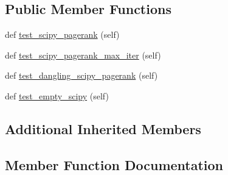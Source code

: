\subsection*{Public Member Functions}
\begin{DoxyCompactItemize}
\item 
def \hyperlink{classnetworkx_1_1algorithms_1_1link__analysis_1_1tests_1_1test__pagerank_1_1TestPageRankScipy_abc01547f97c2c51b48c78322ac5b0fa1}{test\+\_\+scipy\+\_\+pagerank} (self)
\item 
def \hyperlink{classnetworkx_1_1algorithms_1_1link__analysis_1_1tests_1_1test__pagerank_1_1TestPageRankScipy_afa558eb1f7d90ff4ab3643d2a841ddb1}{test\+\_\+scipy\+\_\+pagerank\+\_\+max\+\_\+iter} (self)
\item 
def \hyperlink{classnetworkx_1_1algorithms_1_1link__analysis_1_1tests_1_1test__pagerank_1_1TestPageRankScipy_a3818bbb29b3b9041d94799c892dd5d91}{test\+\_\+dangling\+\_\+scipy\+\_\+pagerank} (self)
\item 
def \hyperlink{classnetworkx_1_1algorithms_1_1link__analysis_1_1tests_1_1test__pagerank_1_1TestPageRankScipy_a4841ba30ab534edc80d2630e8e4297ad}{test\+\_\+empty\+\_\+scipy} (self)
\end{DoxyCompactItemize}
\subsection*{Additional Inherited Members}


\subsection{Member Function Documentation}
\mbox{\label{classnetworkx_1_1algorithms_1_1link__analysis_1_1tests_1_1test__pagerank_1_1TestPageRankScipy_a3818bbb29b3b9041d94799c892dd5d91}} 
